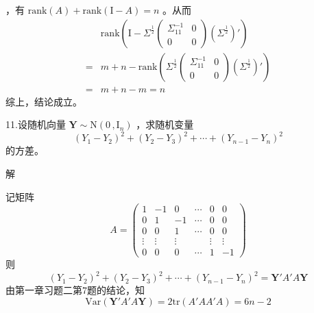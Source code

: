 \documentclass[12pt,hyperref,]{ctexart}
\begin{document}
，有 \(\mathrm{rank}(A)+\mathrm{rank}(\mathrm{I}-A)=n\) 。从而
\begin{equation*}
\begin{aligned}
& \mathrm{rank}\left(
\mathrm{I}-\Sigma^{\frac 12}
\begin{pmatrix}
\Sigma_{11}^{-1} & 0 \\
0 & 0
\end{pmatrix}(\Sigma^{\frac 12})'
\right) \\
=& m+n-\mathrm{rank}\left(
\Sigma^{\frac 12}
\begin{pmatrix}
\Sigma_{11}^{-1} & 0 \\
0 & 0
\end{pmatrix}(\Sigma^{\frac 12})'
\right) \\
=& m+n-m=n
\end{aligned}
\end{equation*}综上，结论成立。

\vspace{3em}

\kaishu

11.设随机向量 \(\boldsymbol{Y}\sim\mathrm{N}(0\, ,\mathrm{I}_n)\)
，求随机变量 \begin{equation*}
(Y_1-Y_2)^2+(Y_2-Y_3)^2+\cdots +(Y_{n-1}-Y_n)^2
\end{equation*}的方差。

\vspace{1em}

\heiti

解

\songti

记矩阵 \begin{equation*}
A=
\begin{pmatrix}
1 & -1 & 0 & \cdots & 0 & 0 \\
0 & 1 & -1 & \cdots & 0 & 0 \\
0 & 0 & 1 & \cdots & 0 & 0 \\
\vdots & \vdots & \vdots & & \vdots & \vdots \\
0 & 0 & 0 & \cdots & 1 & -1
\end{pmatrix}
\end{equation*}则 \begin{equation*}
(Y_1-Y_2)^2+(Y_2-Y_3)^2+\cdots +(Y_{n-1}-Y_n)^2=\boldsymbol{Y}'A'A\boldsymbol{Y}
\end{equation*} 由第一章习题二第7题的结论，知 \begin{equation*}
\mathrm{Var}(\boldsymbol{Y}'A'A\boldsymbol{Y})=2\mathrm{tr}(A'AA'A)=6n-2
\end{equation*}
\end{document}

